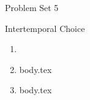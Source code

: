 \documentclass{handout}
\begin{document}
\thispagestyle{empty}

\centerline{\Large Problem Set 5}
\centerline{\large Intertemporal Choice}

\begin{enumerate} 


\item 

\item {body.tex}

\item {body.tex}

\end{enumerate}


\end{document}
